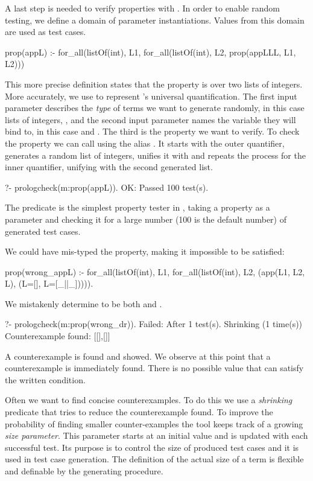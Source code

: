 A last step is needed to verify properties with \plqc{}.
%
In order to enable random testing, we define a domain of parameter
instantiations.
%
Values from this domain are used as test cases.
%
\begin{yapcode}
 prop(appL) :- for_all(listOf(int), L1, for_all(listOf(int), L2,
                   prop({appLLL, L1, L2})))
\end{yapcode}


This more precise definition states that the property  is 
over two lists of integers.
%
More accurately, we use  to represent \plqc{}'s universal quantification.
%
The first input parameter describes the \emph{type} of terms we want to
generate randomly, in this case lists of integers,
, 
and the second input parameter names the variable they will bind to, in this case
 and .
%
The third is the property we want to verify.
%
To check the property we can call \plqc{} using the alias
.
%
It starts with the outer  quantifier, generates a random
list of integers, unifies it with  and repeats the process for
the inner quantifier, unifying  with the second generated list.
%
\begin{yapcode}
   ?- prologcheck(m:prop(appL)).
 OK: Passed 100 test(s).
\end{yapcode}
%
The  predicate is the simplest property tester in
\plqc{}, taking a property as a parameter and checking it for a large
number (100 is the default number) of generated test cases.



We could have mis-typed the property, making it impossible to be satisfied:
%
\begin{yapcode}
 prop(wrong_appL) :- for_all(listOf(int), L1,
   for_all(listOf(int), L2, (app(L1, L2, L), (L=[], L=[_||_])))).
\end{yapcode}
%
We mistakenly determine  to be both  \yap{[]} and  \yap{[_||_]}.
%
\begin{yapcode}
   ?- prologcheck(m:prop(wrong_dr)).
 Failed: After 1 test(s).
 Shrinking (1 time(s))
 Counterexample found: [[],[]]
\end{yapcode}
A counterexample is found and showed.
%
We observe at this point that a counterexample is immediately found.
%
There is no possible value that can satisfy the written condition.



Often we want to find concise counterexamples.
%
To do this we use a \emph{shrinking} predicate that tries to reduce the
counterexample found.
%
To improve the probability of finding smaller counter-examples the tool
keeps track of a growing \emph{size parameter}.
%
This parameter  starts at an initial value and is updated with each
successful test.
%
Its purpose is to control the size of produced test cases and it is used
in test case generation.
%
The definition of the actual size of a term is flexible and definable by
the generating procedure. 



